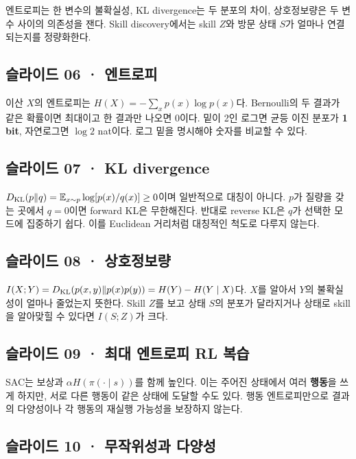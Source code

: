 \documentclass[11pt,a4paper]{article}
\begin{document}
엔트로피는 한 변수의 불확실성, KL divergence는 두 분포의 차이, 상호정보량은 두 변수 사이의 의존성을 잰다. Skill discovery에서는 skill $Z$와 방문 상태 $S$가 얼마나 연결되는지를 정량화한다.\par

\subsection{슬라이드 06 · 엔트로피}

이산 $X$의 엔트로피는 $H(X)=-\sum_xp(x)\log p(x)$다. Bernoulli의 두 결과가 같은 확률이면 최대이고 한 결과만 나오면 0이다. 밑이 2인 로그면 균등 이진 분포가 \textbf{1 bit}, 자연로그면 $\log2$ nat이다. 로그 밑을 명시해야 숫자를 비교할 수 있다.\par

\subsection{슬라이드 07 · KL divergence}

$D_{\rm KL}(p\|q)=\mathbb E_{x\sim p}\log[p(x)/q(x)]\ge0$이며 일반적으로 대칭이 아니다. $p$가 질량을 갖는 곳에서 $q=0$이면 forward KL은 무한해진다. 반대로 reverse KL은 $q$가 선택한 모드에 집중하기 쉽다. 이를 Euclidean 거리처럼 대칭적인 척도로 다루지 않는다.\par

\subsection{슬라이드 08 · 상호정보량}

$I(X;Y)=D_{\rm KL}(p(x,y)\|p(x)p(y))=H(Y)-H(Y\mid X)$다. $X$를 알아서 $Y$의 불확실성이 얼마나 줄었는지 뜻한다. Skill $Z$를 보고 상태 $S$의 분포가 달라지거나 상태로 skill을 알아맞힐 수 있다면 $I(S;Z)$가 크다.\par

\subsection{슬라이드 09 · 최대 엔트로피 RL 복습}

SAC는 보상과 $\alpha H(\pi(\cdot\mid s))$를 함께 높인다. 이는 주어진 상태에서 여러 \textbf{행동}을 쓰게 하지만, 서로 다른 행동이 같은 상태에 도달할 수도 있다. 행동 엔트로피만으로 결과의 다양성이나 각 행동의 재실행 가능성을 보장하지 않는다.\par

\subsection{슬라이드 10 · 무작위성과 다양성}
\end{document}
